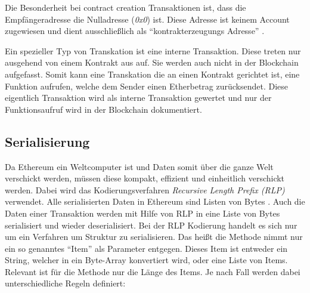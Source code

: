\documentclass[runningheads]{llncs}
\begin{document}
Die Besonderheit bei contract creation Transaktionen ist, dass die Empfängeradresse die Nulladresse (\textit{0x0}) ist. Diese Adresse ist keinem Account zugewiesen und dient ausschließlich als "`kontrakterzeugungs Adresse"' \cite{antonopoulos_mastering_2019}.

Ein spezieller Typ von Transkation ist eine interne Transaktion. Diese treten nur ausgehend von einem Kontrakt aus auf. Sie werden auch nicht in der Blockchain aufgefasst. Somit kann eine Transkation die an einen Kontrakt gerichtet ist, eine Funktion aufrufen, welche dem Sender einen Etherbetrag zurücksendet. Diese eigentlich Transaktion wird als interne Transaktion gewertet und nur der Funktionsaufruf wird in der Blockchain dokumentiert.

\subsection{Serialisierung}
Da Ethereum ein Weltcomputer ist und Daten somit über die ganze Welt verschickt werden, müssen diese kompakt, effizient und einheitlich verschickt werden. Dabei wird das Kodierungsverfahren \textit{Recursive Length Prefix (RLP)} verwendet. Alle serialisierten Daten in Ethereum sind Listen von Bytes \cite[S. 3]{wood_ethereum/yellowpaper_2019}. Auch die Daten einer Transaktion werden mit Hilfe von RLP in eine Liste von Bytes serialisiert und wieder deserialisiert. Bei der RLP Kodierung handelt es sich nur um ein Verfahren um Struktur zu serialisieren. Das heißt die Methode nimmt nur ein so genanntes "`Item"' als Parameter entgegen. Dieses Item ist entweder ein String, welcher in ein Byte-Array konvertiert wird, oder eine Liste von Items. Relevant ist für die Methode nur die Länge des Items. Je nach Fall werden dabei unterschiedliche Regeln definiert:
\end{document}

